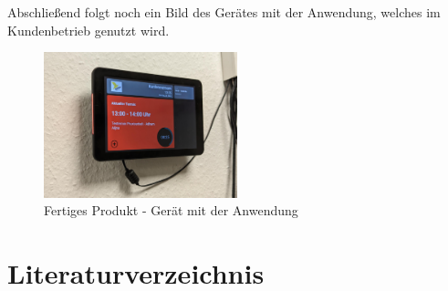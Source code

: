 Abschließend folgt noch ein Bild des Gerätes mit der Anwendung, welches im Kundenbetrieb genutzt wird.
\newline
\par\vspace{1cm}
\begin{figure}[h]
    \centering
    \includegraphics[width=0.5\textwidth]{Bilder/FertigesProdukt}
    \caption{Fertiges Produkt - Gerät mit der Anwendung}
    \label{fig:fertiges-produkt}
\newline
\newline
    \end{figure}
\justifying
\newpage
\section{Literaturverzeichnis}\label{sec:literaturverzeichnis}